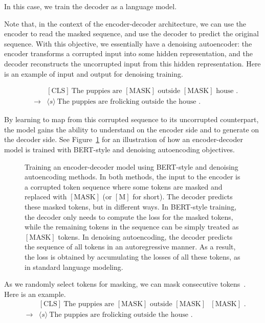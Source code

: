 \noindent In this case, we train the decoder as a language model.

Note that, in the context of the encoder-decoder architecture, we can use the encoder to read the masked sequence, and use the decoder to predict the original sequence. With this objective, we essentially have a denoising autoencoder: the encoder transforms a corrupted input into some hidden representation, and the decoder reconstructs the uncorrupted input from this hidden representation. Here is an example of input and output for denoising training.

\begin{eqnarray}
&     & \mathrm{[CLS]}\ \textrm{The puppies are $\mathrm{[MASK]}$ outside $\mathrm{[MASK]}$ house .} \nonumber \\
& \to & \langle s \rangle\ \textrm{The puppies are frolicking outside the house .} \nonumber
\end{eqnarray}

\noindent By learning to map from this corrupted sequence to its uncorrupted counterpart, the model gains the ability to understand on the encoder side and to generate on the decoder side. See Figure~\ref{fig:encoder-decoder-masked-lm} for an illustration of how an encoder-decoder model is trained with BERT-style and denoising autoencoding objectives.

\begin{figure}[!t]
\centering

\caption{Training an encoder-decoder model using BERT-style and denoising autoencoding methods. In both methods, the input to the encoder is a corrupted token sequence where some tokens are masked and replaced with $\mathrm{[MASK]}$ (or $\mathrm{[M]}$ for short). The decoder predicts these masked tokens, but in different ways. In BERT-style training, the decoder only needs to compute the loss for the masked tokens, while the remaining tokens in the sequence can be simply treated as $\mathrm{[MASK]}$ tokens. In denoising autoencoding, the decoder predicts the sequence of all tokens in an autoregressive manner.  As a result, the loss is obtained by accumulating the losses of all these tokens, as in standard language modeling.}
\label{fig:encoder-decoder-masked-lm}
\end{figure}

As we randomly select tokens for masking, we can mask consecutive tokens~\cite{joshi-etal:2020spanbert}. Here is an example.
\begin{eqnarray}
&     & \mathrm{[CLS]}\ \textrm{The puppies are $\mathrm{[MASK]}$ outside $\mathrm{[MASK]}$ $\mathrm{[MASK]}$ .} \nonumber \\
& \to & \langle s \rangle\ \textrm{The puppies are frolicking outside the house .} \nonumber
\end{eqnarray}

